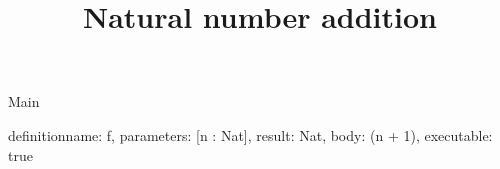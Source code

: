\begin{lexlean}{Main}
\title{Natural number addition}
\begin{semanticmodule}
definition{name: f, parameters: [n : Nat], result: Nat, body: (n + 1), executable: true}
\end{semanticmodule}
\end{lexlean}

